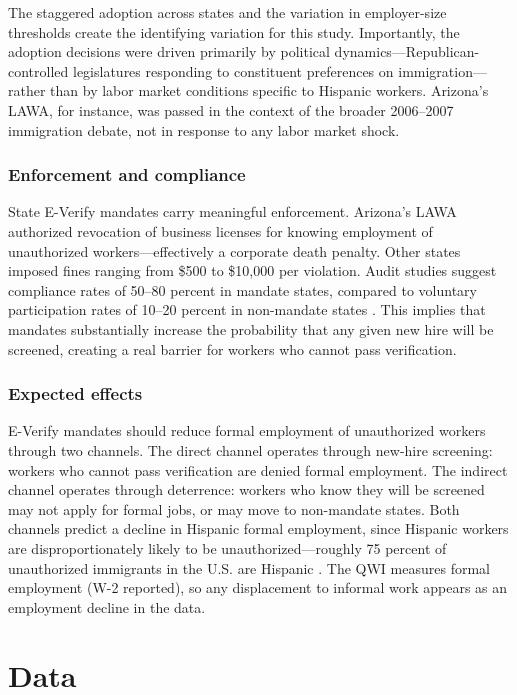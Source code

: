\documentclass[12pt]{article}
\begin{document}
The staggered adoption across states and the variation in employer-size thresholds create the identifying variation for this study. Importantly, the adoption decisions were driven primarily by political dynamics---Republican-controlled legislatures responding to constituent preferences on immigration---rather than by labor market conditions specific to Hispanic workers. Arizona's LAWA, for instance, was passed in the context of the broader 2006--2007 immigration debate, not in response to any labor market shock.

\subsubsection*{Enforcement and compliance} State E-Verify mandates carry meaningful enforcement. Arizona's LAWA authorized revocation of business licenses for knowing employment of unauthorized workers---effectively a corporate death penalty. Other states imposed fines ranging from \$500 to \$10,000 per violation. Audit studies suggest compliance rates of 50--80 percent in mandate states, compared to voluntary participation rates of 10--20 percent in non-mandate states \citep{rosenblum2011}. This implies that mandates substantially increase the probability that any given new hire will be screened, creating a real barrier for workers who cannot pass verification.

\subsubsection*{Expected effects} E-Verify mandates should reduce formal employment of unauthorized workers through two channels. The direct channel operates through new-hire screening: workers who cannot pass verification are denied formal employment. The indirect channel operates through deterrence: workers who know they will be screened may not apply for formal jobs, or may move to non-mandate states. Both channels predict a decline in Hispanic formal employment, since Hispanic workers are disproportionately likely to be unauthorized---roughly 75 percent of unauthorized immigrants in the U.S. are Hispanic \citep{pew2024unauthorized}. The QWI measures formal employment (W-2 reported), so any displacement to informal work appears as an employment decline in the data.


\section{Data}
\end{document}

